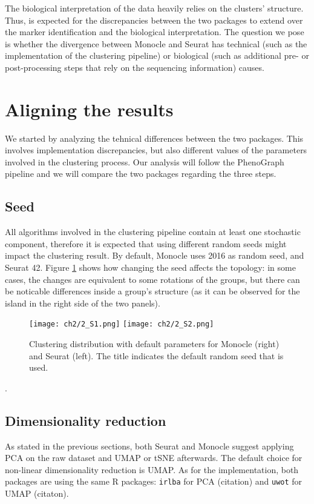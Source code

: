 The biological interpretation of the data heavily relies on the clusters' structure. Thus, is expected for the discrepancies between the two packages to extend over the marker identification and the biological interpretation. The question we pose is whether the divergence between Monocle and Seurat has technical (such as the implementation of the clustering pipeline) or biological (such as additional pre- or post-processing steps that rely on the sequencing information) causes.

\section{Aligning the results}
We started by analyzing the tehnical differences between the two packages. This involves implementation discrepancies, but also different values of the parameters involved in the clustering process. Our analysis will follow the PhenoGraph pipeline and we will compare the two packages regarding the three steps.

\subsection{Seed}
All algorithms involved in the clustering pipeline contain at least one stochastic component, therefore it is expected that using different random seeds might impact the clustering result. By default, Monocle uses 2016 as random seed, and Seurat 42. Figure \ref{fig:s4-m3-seed} shows how changing the seed affects the topology: in some cases, the changes are equivalent to some rotations of the groups, but there can be noticable differences inside a group's structure (as it can be observed for the island in the right side of the two panels).

\begin{figure}[H]
    \centering
    \texttt{[image: ch2/2\_S1.png]}
    \texttt{[image: ch2/2\_S2.png]}
    \caption{\label{fig:s4-m3-seed}Clustering distribution with default parameters for Monocle (right) and Seurat (left). The title indicates the default random seed that is used.}
\end{figure}.

\subsection{Dimensionality reduction}
As stated in the previous sections, both Seurat and Monocle suggest applying PCA on the raw dataset and UMAP or tSNE afterwards. The default choice for non-linear dimensionality reduction is UMAP. As for the implementation, both packages are using the same R packages: \verb|irlba| for PCA (citation) and \verb|uwot| for UMAP (citaton).

